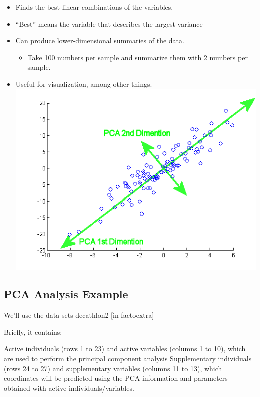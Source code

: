 \documentclass[
]{article}
\providecommand{\tightlist}{%
  \setlength{\itemsep}{0pt}\setlength{\parskip}{0pt}}
\begin{document}
\begin{itemize}
\tightlist
\item
  Finds the best linear combinations of the variables.
\item
  ``Best'' means the variable that describes the largest variance
\item
  Can produce lower-dimensional summaries of the data.

  \begin{itemize}
  \tightlist
  \item
    Take 100 numbers per sample and summarize them with 2 numbers per
    sample.
  \end{itemize}
\item
  Useful for visualization, among other things.
  \includegraphics{PCA.gif}
\end{itemize}

\hypertarget{pca-analysis-example}{%
\subsection{PCA Analysis Example}\label{pca-analysis-example}}

We'll use the data sets decathlon2 {[}in factoextra{]}

Briefly, it contains:

Active individuals (rows 1 to 23) and active variables (columns 1 to
10), which are used to perform the principal component analysis
Supplementary individuals (rows 24 to 27) and supplementary variables
(columns 11 to 13), which coordinates will be predicted using the PCA
information and parameters obtained with active individuals/variables.
\end{document}
